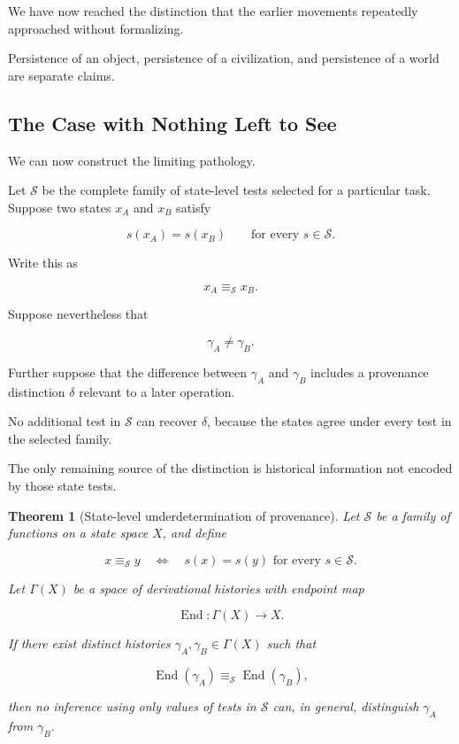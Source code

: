 \documentclass[
  11pt,
  a4paper,
  DIV=12,
  BCOR=0mm,
  parskip=half-
]{scrartcl}
\newcommand{\End}{\operatorname{End}}
\theoremstyle{definition}
\theoremstyle{plain}
\newtheorem{theorem}[definition]{Theorem}
\theoremstyle{remark}
\begin{document}
We have now reached the distinction that the earlier movements repeatedly
approached without formalizing.

Persistence of an object, persistence of a civilization, and persistence of
a world are separate claims.


\subsection{The Case with Nothing Left to See}
\label{sec:nothing-left-to-see}

We can now construct the limiting pathology.

Let \(\mathcal S\) be the complete family of state-level tests selected for a
particular task. Suppose two states \(x_A\) and \(x_B\) satisfy

\[
  s(x_A)=s(x_B)
  \qquad
  \text{for every }s\in\mathcal S.
\]

Write this as

\[
  x_A\equiv_{\mathcal S}x_B.
\]

Suppose nevertheless that

\[
  \gamma_A\neq\gamma_B.
\]

Further suppose that the difference between \(\gamma_A\) and \(\gamma_B\)
includes a provenance distinction \(\delta\) relevant to a later operation.

No additional test in \(\mathcal S\) can recover \(\delta\), because the
states agree under every test in the selected family.

The only remaining source of the distinction is historical information not
encoded by those state tests.

\begin{theorem}[State-level underdetermination of provenance]
\label{thm:state-underdetermination}
Let \(\mathcal S\) be a family of functions on a state space \(X\), and define

\[
  x\equiv_{\mathcal S}y
  \quad\Longleftrightarrow\quad
  s(x)=s(y)
  \text{ for every }s\in\mathcal S.
\]

Let \(\Gamma(X)\) be a space of derivational histories with endpoint map

\[
  \End:\Gamma(X)\to X.
\]

If there exist distinct histories
\(\gamma_A,\gamma_B\in\Gamma(X)\) such that

\[
  \End(\gamma_A)\equiv_{\mathcal S}\End(\gamma_B),
\]

then no inference using only values of tests in \(\mathcal S\) can, in
general, distinguish \(\gamma_A\) from \(\gamma_B\).
\end{theorem}
\end{document}
